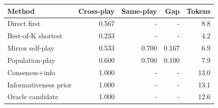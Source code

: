 \begin{tabular}{lrrrr}
\toprule
Method & Cross-play & Same-play & Gap & Tokens \\
\midrule
Direct first & 0.567 & - & - & 8.8 \\
Best-of-K shortest & 0.233 & - & - & 4.2 \\
Mirror self-play & 0.533 & 0.700 & 0.167 & 6.9 \\
Population-play & 0.600 & 0.700 & 0.100 & 7.9 \\
Consensus+info & 1.000 & - & - & 13.0 \\
Informativeness prior & 1.000 & - & - & 13.1 \\
Oracle candidate & 1.000 & - & - & 12.6 \\
\bottomrule
\end{tabular}
